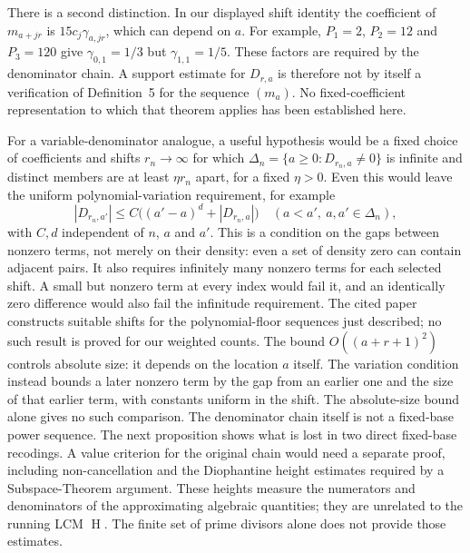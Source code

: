 \documentclass[11pt]{article}
\theoremstyle{remark}
\theoremstyle{plain}
\newcommand{\hgt}{\operatorname{H}}
\begin{document}
There is a second distinction.  In our displayed shift identity the
coefficient of $m_{a+jr}$ is $15c_j\gamma_{a,jr}$, which can depend on $a$.
For example, $P_1=2$, $P_2=12$ and $P_3=120$ give
$\gamma_{0,1}=1/3$ but $\gamma_{1,1}=1/5$.  These factors are required by
the denominator chain.  A support estimate for $D_{r,a}$ is therefore not
by itself a verification of Definition~5 for the sequence $(m_a)$.
No fixed-coefficient representation to which that theorem applies has
been established here.

For a variable-denominator analogue, a useful hypothesis would be a fixed
choice of coefficients and shifts $r_n\to\infty$
for which $\Delta_n=\{a\ge0:D_{r_n,a}\ne0\}$ is infinite and distinct
members are at least $\eta r_n$ apart, for a fixed $\eta>0$.
Even this would leave the uniform polynomial-variation requirement, for
example
\[
 |D_{r_n,a'}|\le C\bigl((a'-a)^d+|D_{r_n,a}|\bigr)
 \quad(a<a',\ a,a'\in\Delta_n),
\]
with $C,d$ independent of $n$, $a$ and $a'$.
This is a condition on the gaps between nonzero terms, not merely on
their density: even a set of density zero can contain adjacent pairs.
It also requires infinitely many nonzero terms for each selected shift.  A small
but nonzero term at every index would fail it, and an identically zero
difference would also fail the infinitude requirement.  The cited paper
constructs suitable shifts for the polynomial-floor sequences just
described; no such result is proved for our weighted counts.  The bound $O((a+r+1)^2)$ controls
absolute size: it depends on the location $a$ itself.  The variation
condition instead bounds a later nonzero term by the gap from an earlier
one and the size of that earlier term, with constants uniform in the
shift.  The absolute-size bound alone gives no such comparison.
The denominator chain itself is not a fixed-base power sequence.  The
next proposition shows what is lost in two direct fixed-base recodings.
A value criterion for the original chain would need a separate proof,
including non-cancellation and the Diophantine height estimates required
by a Subspace-Theorem argument. These heights measure the numerators and
denominators of the approximating algebraic quantities; they are unrelated
to the running LCM $\hgt$.
The finite set of prime divisors alone does not provide those estimates.
\end{document}

